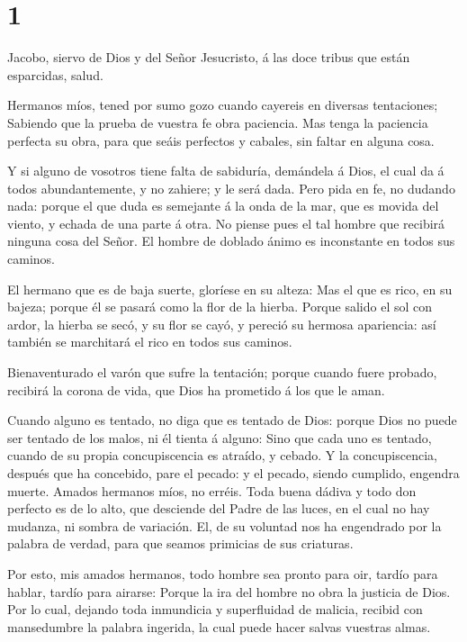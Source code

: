 \hypertarget{section}{%
\section{1}\label{section}}

 Jacobo, siervo de Dios y del Señor Jesucristo, á las doce
tribus que están esparcidas, salud.

 Hermanos míos, tened por sumo gozo cuando cayereis en
diversas tentaciones;  Sabiendo que la prueba de vuestra fe
obra paciencia.  Mas tenga la paciencia perfecta su obra,
para que seáis perfectos y cabales, sin faltar en alguna cosa.

 Y si alguno de vosotros tiene falta de sabiduría, demándela
á Dios, el cual da á todos abundantemente, y no zahiere; y le será dada.
 Pero pida en fe, no dudando nada: porque el que duda es
semejante á la onda de la mar, que es movida del viento, y echada de una
parte á otra.  No piense pues el tal hombre que recibirá
ninguna cosa del Señor.  El hombre de doblado ánimo es
inconstante en todos sus caminos.

 El hermano que es de baja suerte, gloríese en su alteza:
 Mas el que es rico, en su bajeza; porque él se pasará como
la flor de la hierba.  Porque salido el sol con ardor, la
hierba se secó, y su flor se cayó, y pereció su hermosa apariencia: así
también se marchitará el rico en todos sus caminos.

 Bienaventurado el varón que sufre la tentación; porque
cuando fuere probado, recibirá la corona de vida, que Dios ha prometido
á los que le aman.

 Cuando alguno es tentado, no diga que es tentado de Dios:
porque Dios no puede ser tentado de los malos, ni él tienta á alguno:
 Sino que cada uno es tentado, cuando de su propia
concupiscencia es atraído, y cebado.  Y la concupiscencia,
después que ha concebido, pare el pecado: y el pecado, siendo cumplido,
engendra muerte.  Amados hermanos míos, no erréis.
 Toda buena dádiva y todo don perfecto es de lo alto, que
desciende del Padre de las luces, en el cual no hay mudanza, ni sombra
de variación.  El, de su voluntad nos ha engendrado por la
palabra de verdad, para que seamos primicias de sus criaturas.

 Por esto, mis amados hermanos, todo hombre sea pronto para
oir, tardío para hablar, tardío para airarse:  Porque la
ira del hombre no obra la justicia de Dios.  Por lo cual,
dejando toda inmundicia y superfluidad de malicia, recibid con
mansedumbre la palabra ingerida, la cual puede hacer salvas vuestras
almas.

